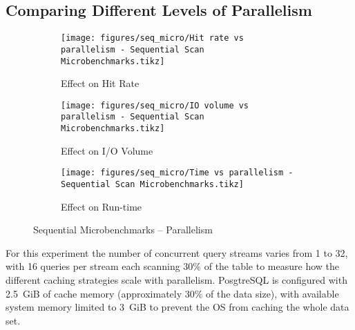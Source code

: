 


\subsection{Comparing Different Levels of Parallelism}
\label{sec:experiment_micro_parallelism}


\begin{figure}[p]
\centering
\begin{subfigure}{0.45\textwidth}
    \centering
    \texttt{[image: figures/seq\_micro/Hit rate vs parallelism - Sequential Scan Microbenchmarks.tikz]}
    \caption{Effect on Hit Rate}
    \label{fig:seq_micro_parallel_hitrate}
\end{subfigure}\hspace{0.05\textwidth}%
\begin{subfigure}{0.45\textwidth}
    \centering
    \texttt{[image: figures/seq\_micro/IO volume vs parallelism - Sequential Scan Microbenchmarks.tikz]}
    \caption{Effect on I/O Volume}
    \label{fig:seq_micro_parallel_iovol}
\end{subfigure}

\vspace{20pt}
\begin{subfigure}{0.45\textwidth}
    \centering
    \texttt{[image: figures/seq\_micro/Time vs parallelism - Sequential Scan Microbenchmarks.tikz]}
    \caption{Effect on Run-time}
    \label{fig:seq_micro_parallel_time}
\end{subfigure}%

\caption{Sequential Microbenchmarks -- Parallelism}
\label{fig:seq_micro_parallelism}
\end{figure}


For this experiment the number of concurrent query streams varies from 1 to 32, with 16 queries per stream each scanning 30\% of the table to measure how the different caching strategies scale with parallelism. PosgtreSQL is configured with 2.5~GiB of cache memory (approximately 30\% of the data size), with available system memory limited to 3~GiB to prevent the OS from caching the whole data set. %

